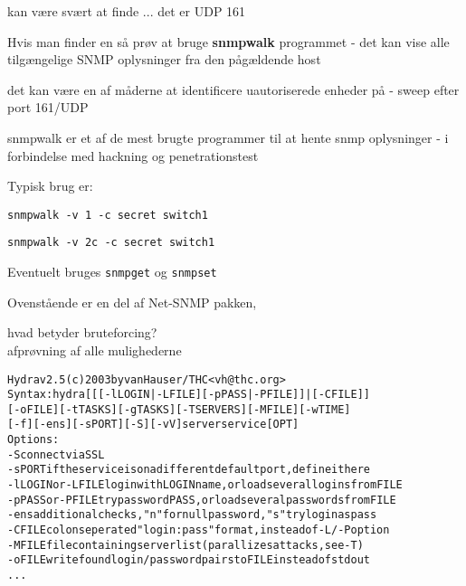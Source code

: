 \documentclass[Screen16to9,17pt]{foils}
\begin{document}

\begin{list1}
  \item kan være svært at finde ... det er UDP 161
\item Hvis man finder en så prøv at bruge {\bfseries snmpwalk}
  programmet - det kan vise alle tilgængelige SNMP oplysninger fra den
  pågældende host
\item det kan være en af måderne at identificere uautoriserede enheder på - sweep efter port 161/UDP
\item snmpwalk er et af de mest brugte programmer til at hente snmp
  oplysninger - i forbindelse med hackning og penetrationstest
\end{list1}


\begin{list1}
\item Typisk brug er:
\item \verb+snmpwalk -v 1 -c secret switch1+
\item \verb+snmpwalk -v 2c -c secret switch1+
\item Eventuelt bruges \verb+snmpget+ og \verb+snmpset+
\item Ovenstående er en del af Net-SNMP pakken, 
\end{list1}





\begin{list1}
\item hvad betyder bruteforcing?\\
afprøvning af alle mulighederne
\end{list1}

\begin{alltt}
\small
Hydra v2.5 (c) 2003 by van Hauser / THC <vh@thc.org>
Syntax: hydra [[[-l LOGIN|-L FILE] [-p PASS|-P FILE]] | [-C FILE]]
[-o FILE] [-t TASKS] [-g TASKS] [-T SERVERS] [-M FILE] [-w TIME]
[-f] [-e ns] [-s PORT] [-S] [-vV] server service [OPT]
Options:
  -S        connect via SSL
  -s PORT   if the service is on a different default port, define it here
  -l LOGIN  or -L FILE login with LOGIN name, or load several logins from FILE
  -p PASS   or -P FILE try password PASS, or load several passwords from FILE
  -e ns     additional checks, "n" for null password, "s" try login as pass
  -C FILE   colon seperated "login:pass" format, instead of -L/-P option
  -M FILE   file containing server list (parallizes attacks, see -T)
  -o FILE   write found login/password pairs to FILE instead of stdout
...
\end{alltt}
\end{document}
